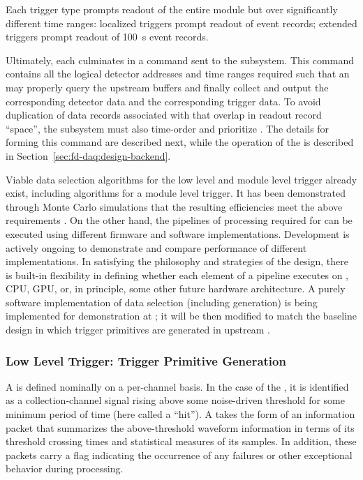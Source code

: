 \noindent Each trigger type prompts readout
of the entire module but over significantly different time
ranges: localized triggers prompt readout of \spreadout event records; extended
triggers prompt readout of \SI{100}{\second} event records. 

Ultimately, each  culminates in a command sent to
the  subsystem. 
This command contains all the logical detector addresses and time ranges
required such that an  may properly query the upstream 
buffers and finally collect and output the corresponding detector data
and the corresponding trigger data. To avoid duplication of data
records associated with  that overlap in readout
record ``space'', the  subsystem must also time-order and
prioritize . The details for forming this
command are described next, while the operation of the  is
described in Section~\ref{sec:fd-daq:design-backend}.

Viable data selection algorithms for the low level and module level trigger already exist, including
algorithms for a module level  trigger.  It has
been demonstrated through Monte Carlo simulations that the resulting efficiencies meet the above
requirements \cite{bib:docdb11215,bib:docdb14522}. On the other hand, the pipelines of processing required
for  can be executed using different firmware and software
implementations. Development is actively ongoing to demonstrate
and compare performance of different implementations. In satisfying
the philosophy and strategies of the  design, there is built-in
flexibility in defining whether each element of a pipeline executes on
, CPU, GPU, or, in principle, some other future hardware
architecture. A purely software implementation of data selection
(including  generation) is being
implemented for demonstration at ; it will be then
modified to match the baseline design in which trigger primitives are
generated in upstream  .


\subsubsection{Low Level Trigger: Trigger Primitive Generation}
\label{sec:sp-daq:design-trigger-primitives}

A  is defined nominally on a per-channel basis. In the case of
the  , it is identified as a
collection-channel signal rising above some noise-driven threshold for some minimum period of time (here called a
``hit'').
A  takes the form of an information packet that 
summarizes the above-threshold waveform information in terms of its
threshold crossing times and statistical measures of its  samples. 
In addition, these packets carry a flag indicating the occurrence of any
failures or other exceptional behavior during  processing.

